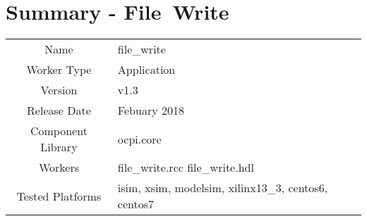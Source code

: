 \documentclass{article}
\author{} %
\date{Version \docVersion} %
\title{\docTitle}
\def\docVersion{1.3}
\def\comp{file\_write}
\def\Comp{File\ Write }
\begin{document}
\section*{Summary - \Comp}
\begin{tabular}{|c|M{13.5cm}|}
	\hline
	                  &                                                                                \\
	\hline
	Name              & \comp                                                                          \\
	\hline
	Worker Type       & Application                                                                    \\
	\hline
	Version           &  v\docVersion \\
	\hline
	Release Date      &  Febuary 2018 \\
	\hline
	Component Library &   ocpi.core\\
	\hline
	Workers           &  file\_write.rcc file\_write.hdl\\
	\hline
	Tested Platforms  &  isim, xsim, modelsim, xilinx13\_3, centos6, centos7\\
	\hline
\end{tabular}
\end{document}

